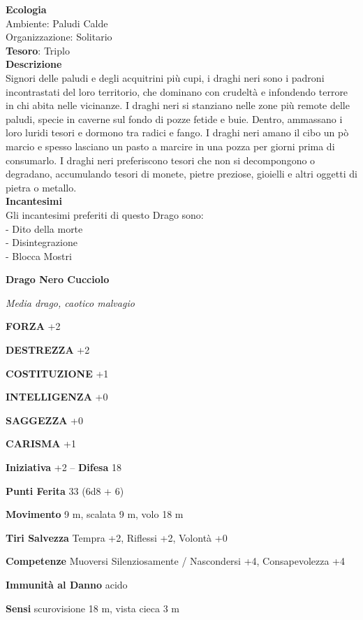 \begin{multicols}{2}
	\textbf{Ecologia}\\
	Ambiente: Paludi Calde\\
	Organizzazione: Solitario\\
	\textbf{Tesoro}: Triplo\\
	\textbf{Descrizione}\\
	Signori delle paludi e degli acquitrini più cupi, i draghi neri sono i padroni incontrastati del loro territorio, che dominano con crudeltà e infondendo terrore in chi abita nelle vicinanze. I draghi neri si stanziano nelle zone più remote delle paludi, specie in caverne sul fondo di pozze fetide e buie. Dentro, ammassano i loro luridi tesori e dormono tra radici e fango. I draghi neri amano il cibo un pò marcio e spesso lasciano un pasto a marcire in una pozza per giorni prima di consumarlo. I draghi neri preferiscono tesori che non si decompongono o degradano, accumulando tesori di monete, pietre preziose, gioielli e altri oggetti di pietra o metallo.\\
	\textbf{Incantesimi}\\
	Gli incantesimi preferiti di questo Drago sono:\\
	- Dito della morte\\
	- Disintegrazione\\
	- Blocca Mostri


	\medskip{}\textbf{Drago Nero Cucciolo}

	\textit{Media drago, caotico malvagio}

	\textbf{FORZA} +2

	\textbf{DESTREZZA} +2

	\textbf{COSTITUZIONE} +1

	\textbf{INTELLIGENZA} +0

	\textbf{SAGGEZZA} +0

	\textbf{CARISMA} +1

	\textbf{Iniziativa} +2 -- \textbf{Difesa} 18

	\textbf{Punti Ferita} 33 (6d8 + 6)

	\textbf{Movimento} 9 m, scalata 9 m, volo 18 m

	\textbf{Tiri Salvezza} Tempra +2, Riflessi +2, Volontà +0

	\textbf{Competenze} Muoversi Silenziosamente / Nascondersi +4, Consapevolezza +4

	\textbf{Immunità al Danno} acido

	\textbf{Sensi} scurovisione 18 m, vista cieca 3 m


\end{multicols}
